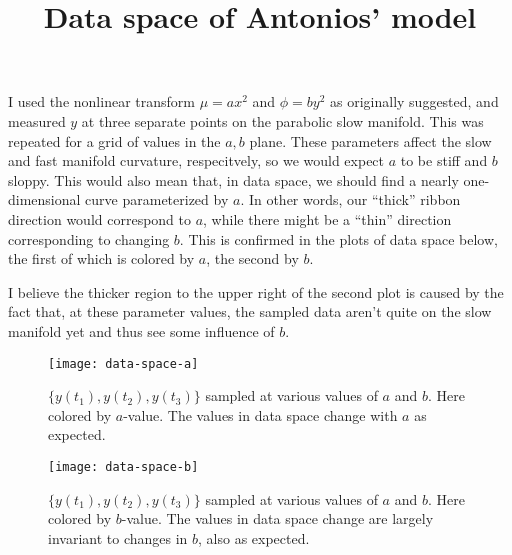 \documentclass[11pt]{article}
\title{Data space of Antonios' model}
\begin{document}
\maketitle

I used the nonlinear transform $\mu = ax^2$ and $\phi = b y^2$ as originally suggested, and measured $y$ at three separate points on the parabolic slow manifold. This was repeated for a grid of values in the $a,b$ plane. These parameters affect the slow and fast manifold curvature, respecitvely, so we would expect $a$ to be stiff and $b$ sloppy. This would also mean that, in data space, we should find a nearly one-dimensional curve parameterized by $a$. In other words, our ``thick'' ribbon direction would correspond to $a$, while there might be a ``thin'' direction corresponding to changing $b$. This is confirmed in the plots of data space below, the first of which is colored by $a$, the second by $b$. 

I believe the thicker region to the upper right of the second plot is caused by the fact that, at these parameter values, the sampled data aren't quite on the slow manifold yet and thus see some influence of $b$.

\begin{figure}[htbp]
  \centering
  \texttt{[image: data-space-a]}
  \caption{$\{y(t_1), y(t_2), y(t_3)\}$ sampled at various values of $a$ and $b$. Here colored by $a$-value. The values in data space change with $a$ as expected.}
\end{figure}

\begin{figure}[htbp]
  \centering
  \texttt{[image: data-space-b]}
  \caption{$\{y(t_1), y(t_2), y(t_3)\}$ sampled at various values of $a$ and $b$. Here colored by $b$-value. The values in data space change are largely invariant to changes in $b$, also as expected.}
\end{figure}



% 
% 
\end{document}
